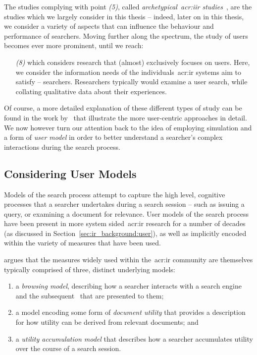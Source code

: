 The studies complying with point \emph{(5)}, called \emph{archetypical~\gls{acr:iir} studies}~\citep{kelly2009iir}, are the studies which we largely consider in this thesis -- indeed, later on in this thesis, we consider a variety of aspects that can influence the behaviour and performance of searchers. Moving further along the spectrum, the study of users becomes ever more prominent, until we reach:

\begin{itemize}
    
    \item[\emph{(8)}]{ which considers research that (almost) exclusively focuses on users. Here, we consider the information needs of the individuals~\gls{acr:ir} systems aim to satisfy -- searchers. Researchers typically would examine a user search, while collating qualitative data about their experiences.}
    
\end{itemize}

Of course, a more detailed explanation of these different types of study can be found in the work by~\cite{kelly2009iir} that illustrate the more user-centric approaches in detail. We now however turn our attention back to the idea of employing simulation and a form of \emph{user model} in order to better understand a searcher's complex interactions during the search process.

\subsection{Considering User Models}\label{sec:ir_background:user:models}
Models of the search process attempt to capture the high level, cognitive processes that a searcher undertakes during a search session -- such as issuing a query, or examining a document for relevance. User models of the search process have been present in more system sided~\gls{acr:ir} research for a number of decades (as discussed in Section~\ref{sec:ir_background:user}), as well as implicitly encoded within the variety of measures that have been used.

\cite{carterette2011models} argues that the measures widely used within the~\gls{acr:ir} community are themselves typically comprised of three, distinct underlying models:

\begin{enumerate}
    \item{a \emph{browsing model}, describing how a searcher interacts with a search engine and the subsequent~ that are presented to them;}
    \item{a model encoding some form of \emph{document utility} that provides a description for how utility can be derived from relevant documents; and}
    \item{a \emph{utility accumulation model} that describes how a searcher accumulates utility over the course of a search session.}
\end{enumerate}


